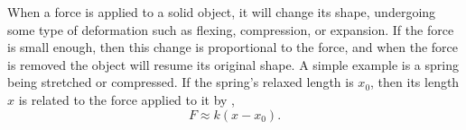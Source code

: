 When a force is applied to a solid object, it will change its shape,
undergoing some type of deformation such as flexing, compression, or
expansion. If the force is small enough, then this change is proportional
to the force, and when the force is removed the object will resume its original shape.
A simple example is a spring being stretched or compressed. If the spring's
relaxed length is $x_0$, then its length $x$ is related to the force applied to it
by ,
\begin{equation}
  F \approx k(x-x_0).
\end{equation}

